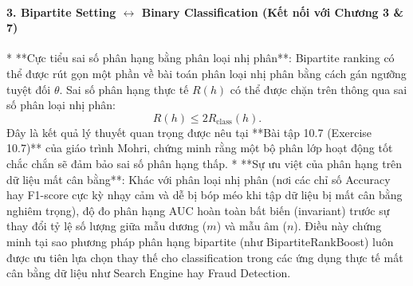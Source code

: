 \paragraph{3. Bipartite Setting $\leftrightarrow$ Binary Classification (Kết nối với Chương 3 \& 7)}
* **Cực tiểu sai số phân hạng bằng phân loại nhị phân**: Bipartite ranking có thể được rút gọn một phần về bài toán phân loại nhị phân bằng cách gán ngưỡng tuyệt đối $\theta$. Sai số phân hạng thực tế $R(h)$ có thể được chặn trên thông qua sai số phân loại nhị phân:
  \begin{equation}
      R(h) \leq 2 R_{\text{class}}(h).
  \end{equation}
  Đây là kết quả lý thuyết quan trọng được nêu tại **Bài tập 10.7 (Exercise 10.7)** của giáo trình Mohri, chứng minh rằng một bộ phân lớp hoạt động tốt chắc chắn sẽ đảm bảo sai số phân hạng thấp.
* **Sự ưu việt của phân hạng trên dữ liệu mất cân bằng**: Khác với phân loại nhị phân (nơi các chỉ số Accuracy hay F1-score cực kỳ nhạy cảm và dễ bị bóp méo khi tập dữ liệu bị mất cân bằng nghiêm trọng), độ đo phân hạng AUC hoàn toàn bất biến (invariant) trước sự thay đổi tỷ lệ số lượng giữa mẫu dương ($m$) và mẫu âm ($n$). Điều này chứng minh tại sao phương pháp phân hạng bipartite (như BipartiteRankBoost) luôn được ưu tiên lựa chọn thay thế cho classification trong các ứng dụng thực tế mất cân bằng dữ liệu như Search Engine hay Fraud Detection.
